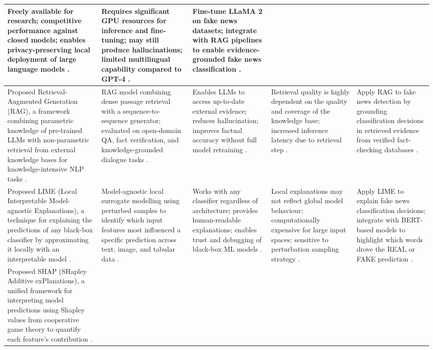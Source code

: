 \begin{longtable}{|p{}|p{}|p{}|p{}|p{}|}
Freely available for research; competitive performance against closed models; enables privacy-preserving local deployment of large language models \cite{Touvron2023Llama2}. &
Requires significant GPU resources for inference and fine-tuning; may still produce hallucinations; limited multilingual capability compared to GPT-4 \cite{Touvron2023Llama2}. &
Fine-tune LLaMA 2 on fake news datasets; integrate with RAG pipelines to enable evidence-grounded fake news classification \cite{Touvron2023Llama2}. \\ \hline
Proposed Retrieval-Augmented Generation (RAG), a framework combining parametric knowledge of pre-trained LLMs with non-parametric retrieval from external knowledge bases for knowledge-intensive NLP tasks \cite{Lewis2020RAG}. &
RAG model combining dense passage retrieval with a sequence-to-sequence generator; evaluated on open-domain QA, fact verification, and knowledge-grounded dialogue tasks \cite{Lewis2020RAG}. &
Enables LLMs to access up-to-date external evidence; reduces hallucination; improves factual accuracy without full model retraining \cite{Lewis2020RAG}. &
Retrieval quality is highly dependent on the quality and coverage of the knowledge base; increased inference latency due to retrieval step \cite{Lewis2020RAG}. &
Apply RAG to fake news detection by grounding classification decisions in retrieved evidence from verified fact-checking databases \cite{Lewis2020RAG}. \\ \hline
Proposed LIME (Local Interpretable Model-agnostic Explanations), a technique for explaining the predictions of any black-box classifier by approximating it locally with an interpretable model \cite{Ribeiro2016LIME}. &
Model-agnostic local surrogate modelling using perturbed samples to identify which input features most influenced a specific prediction across text, image, and tabular data \cite{Ribeiro2016LIME}. &
Works with any classifier regardless of architecture; provides human-readable explanations; enables trust and debugging of black-box ML models \cite{Ribeiro2016LIME}. &
Local explanations may not reflect global model behaviour; computationally expensive for large input spaces; sensitive to perturbation sampling strategy \cite{Ribeiro2016LIME}. &
Apply LIME to explain fake news classification decisions; integrate with BERT-based models to highlight which words drove the REAL or FAKE prediction \cite{Ribeiro2016LIME}. \\ \hline
Proposed SHAP (SHapley Additive exPlanations), a unified framework for interpreting model predictions using Shapley values from cooperative game theory to quantify each feature's contribution \cite{Lundberg2017SHAP}. &

\end{longtable}
